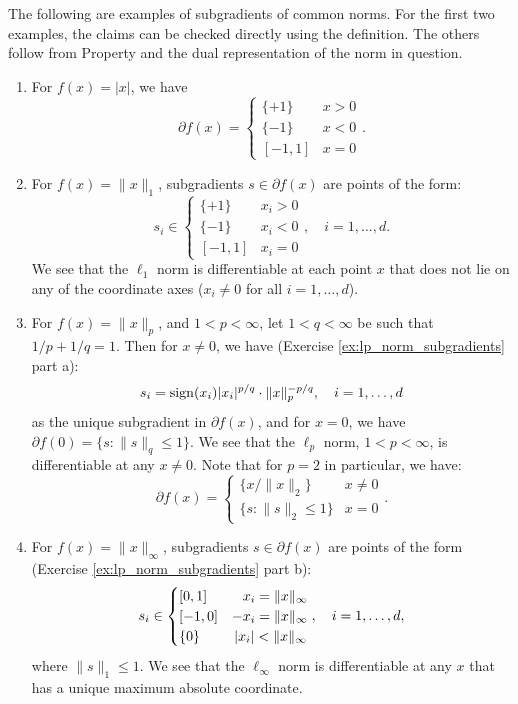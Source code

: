 \begin{Example}
\label{xa:norm_subgradients}
The following are examples of subgradients of common norms. For the first two
examples, the claims can be checked directly using the definition. The others
follow from Property  and the dual
representation of the norm in question. %

\begin{enumerate}[label=\alph*., ref=\alph*]
\item For $f(x) = |x|$, we have 
  \[
  \partial f(x) = \begin{cases}
  \{+1\} & x > 0 \\
  \{-1\} & x < 0 \\
  [-1,1] & x = 0
  \end{cases}.
  \]

\item {}
  For $f(x) = \|x\|_1$, subgradients $s \in \partial f(x)$ are points of the
  form:  
  \[
  s_i \in \begin{cases}
  \{+1\} & x_i > 0 \\
  \{-1\} & x_i < 0 \\
  [-1,1] & x_i = 0
  \end{cases}, \quad i=1,\ldots,d.
  \]
  We see that the $\ell_1$ norm is differentiable at each point $x$ that does
  not lie on any of the coordinate axes ($x_i \not=0$ for all 
  $i=1,\ldots,d$).  

\item {}
  For $f(x) = \|x\|_p$, and $1 < p < \infty$, let $1 < q < \infty$ be such that
  $1/p + 1/q = 1$. Then for $x \not= 0$, we have (Exercise
  \ref{ex:lp_norm_subgradients} part a):   
  \[
  s_i = \operatorname{sign}(x_i) |x_i|^{p/q} \cdot \|x\|_p^{-p/q}, \quad i=1,\ldots,d 
  \]
  as the unique subgradient in $\partial f(x)$, and for $x=0$, we have $\partial
  f(0) = \{s : \|s\|_q \leq 1\}$. We see that the $\ell_p$ norm, $1 < p <
  \infty$, is differentiable at any $x \not= 0$. Note that for $p=2$ in
  particular, we have:
  \[
  \partial f(x) = \begin{cases}
  \{x / \|x\|_2\} & x \not= 0 \\
  \{s : \|s\|_2 \leq 1\} & x = 0
  \end{cases}.
  \]

\item {} 
  For $f(x) = \|x\|_\infty$, subgradients $s \in \partial f(x)$ are points of
  the form (Exercise \ref{ex:lp_norm_subgradients} part b): 
  \[
  s_i \in \begin{cases}
  [0,1] & \hphantom{-} x_i = \|x\|_\infty \\   
  [-1,0] & -x_i = \|x\|_\infty \\
  \{0\} & \, |x_i| < \|x\|_\infty
  \end{cases}, \quad i=1,\ldots,d,
  \]
  where $\|s\|_1 \leq 1$. We see that the $\ell_\infty$ norm is differentiable
  at any $x$ that has a unique maximum absolute coordinate.  


\end{enumerate}
\end{Example}
